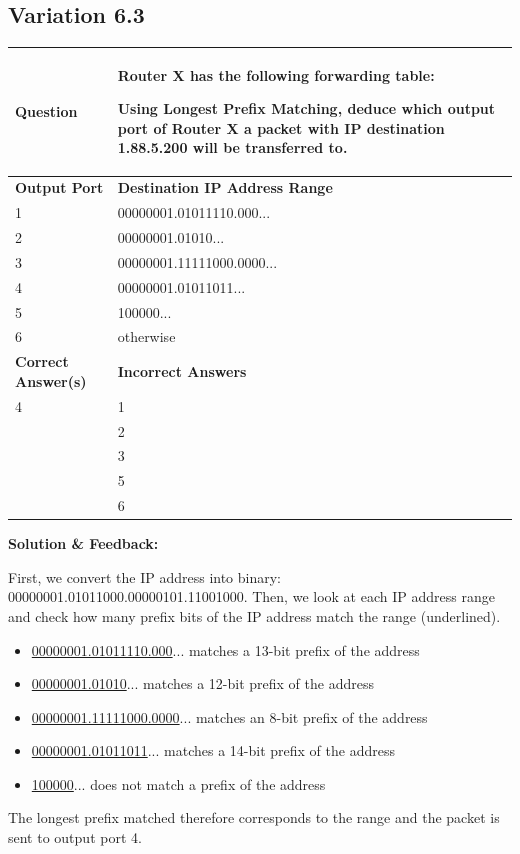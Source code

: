 \subsection{Variation 6.3}

\begin{tabular}{|p{6cm}|p{6cm}|}
    \hline
    \textbf{Question} & Router X has the following forwarding table:

Using Longest Prefix Matching, deduce which output port of Router X a packet with IP destination 1.88.5.200 will be transferred to. \\
    \hline
    \textbf{Output Port} & \textbf{Destination IP Address Range} \\
    \hline
    1 & 00000001.01011110.000... \\
    2 & 00000001.01010... \\
    3 & 00000001.11111000.0000... \\
    4 & 00000001.01011011... \\
    5 & 100000... \\
    6 & otherwise \\
    \hline
    \textbf{Correct Answer(s)} & \textbf{Incorrect Answers} \\
    \hline
    4 & 1 \\
        & 2 \\
        & 3 \\
        & 5 \\
        & 6 \\
    \hline
\end{tabular}

\textbf{Solution \& Feedback:}

First, we convert the IP address into binary: 00000001.01011000.00000101.11001000.
Then, we look at each IP address range and check how many prefix bits of the IP address match the range (underlined).
\begin{itemize}
    \item \underline{00000001.01011110.000}... matches a 13-bit prefix of the address
    \item \underline{00000001.01010}... matches a 12-bit prefix of the address
    \item \underline{00000001.11111000.0000}... matches an 8-bit prefix of the address
    \item \underline{00000001.01011011}... matches a 14-bit prefix of the address
    \item \underline{100000}... does not match a prefix of the address
\end{itemize}
The longest prefix matched therefore corresponds to the range and the packet is sent to output port 4.

